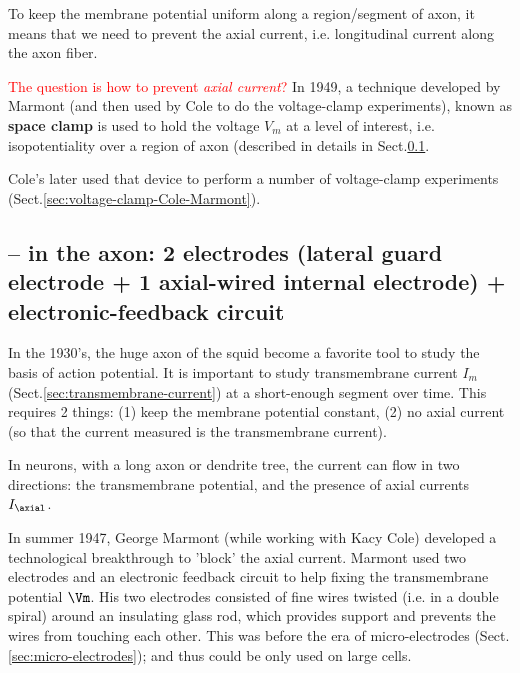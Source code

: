 To keep the membrane potential uniform along a region/segment of axon, it means
that we need to prevent the axial current, i.e. longitudinal current along the
axon fiber.

\textcolor{red}{The question is how to prevent {\it axial current}?}
In 1949, a technique developed by Marmont (and then used by Cole to do the
voltage-clamp experiments), known as {\bf space clamp} is used to hold the
voltage $V_m$ at a level of interest, i.e. isopotentiality over a region of
axon (described in details in Sect.\ref{sec:space-clamp-axon}.

Cole's later used that device to perform a number of voltage-clamp experiments
(Sect.\ref{sec:voltage-clamp-Cole-Marmont}).



\subsection{-- in the axon: 2 electrodes (lateral guard electrode + 1
axial-wired internal electrode) + electronic-feedback circuit}
\label{sec:space-clamp-axon}

In the 1930's, the huge axon of the squid become a favorite tool to study the
basis of action potential. It is important to study transmembrane current $I_m$
(Sect.\ref{sec:transmembrane-current}) at a short-enough segment over time.
This requires 2 things: (1) keep the membrane potential constant, (2) no axial
current (so that the current measured is the transmembrane current).

In neurons, with a long axon or dendrite tree, the current can flow in two
directions: the transmembrane potential, and the
presence of axial currents $I_\axial$.

In summer 1947,  George Marmont (while working with Kacy Cole) developed a
technological breakthrough to 'block' the axial current. 
Marmont used two electrodes and an electronic feedback circuit to help fixing
the transmembrane potential $\Vm$. His two electrodes consisted of fine wires
twisted (i.e. in a double spiral) around an insulating glass rod,  which
provides support and prevents the wires from touching each other.
This was before the era of micro-electrodes (Sect.\ref{sec:micro-electrodes});
and thus could be only used on large cells.

